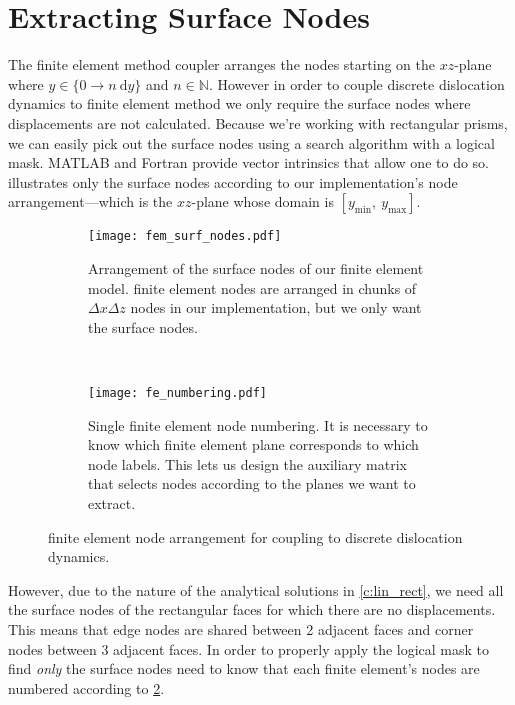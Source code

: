 \section{Extracting Surface Nodes}
The finite element method coupler arranges the nodes starting on the $ xz $-plane where $ y \in \{0 \to n~\mathrm{d}y\}$ and $n\in \mathbb{N} $. However in order to couple discrete dislocation dynamics to finite element method we only require the surface nodes where displacements are not calculated. Because we're working with rectangular prisms, we can easily pick out the surface nodes using a search algorithm with a logical mask. MATLAB and Fortran provide vector intrinsics that allow one to do so.  illustrates only the surface nodes according to our implementation's node arrangement---which is the $ xz $-plane whose domain is $[y_{\text{min}},~ y_{\text{max}}]$.
\begin{figure}
	\centering
	\begin{subfigure}[b]{0.45\linewidth}
		\centering
		\texttt{[image: fem\_surf\_nodes.pdf]}
		\caption[Surface nodes of our finite element model.]{Arrangement of the surface nodes of our finite element model. finite element nodes are arranged in chunks of $ \Delta x \Delta z $ nodes in our implementation, but we only want the surface nodes.}
		\label{f:fem_surf_nodes}
	\end{subfigure}
	~
	\begin{subfigure}[b]{0.45\linewidth}
		\centering
		\texttt{[image: fe\_numbering.pdf]}
		\caption[Single finite element node numbering.]{Single finite element node numbering. It is necessary to know which finite element plane corresponds to which node labels. This lets us design the auxiliary matrix that selects nodes according to the planes we want to extract.}
		\label{f:fe_numbering}
	\end{subfigure}
	\caption[Finite Element node arrangement for coupling to Discrete Dislocation Dynamics.]{finite element node arrangement for coupling to discrete dislocation dynamics.}
	\label{f:fem_node_arr}
\end{figure}
However, due to the nature of the analytical solutions in \cref{c:lin_rect}, we need all the surface nodes of the rectangular faces for which there are no displacements. This means that edge nodes are shared between 2 adjacent faces and corner nodes between 3 adjacent faces. In order to properly apply the logical mask to find \emph{only} the surface nodes need to know that each finite element's nodes are numbered according to \cref{f:fe_numbering}.

